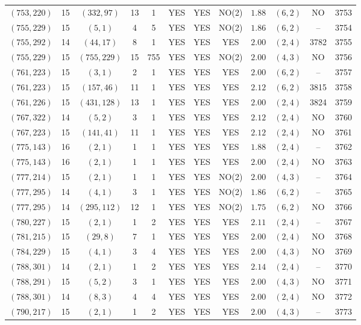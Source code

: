 \begin{longtable}{|c|c|c|c|c|c|c|c|c|c|c|c|}
$(753,220)$ & 15 & $(332,97)$ & 13 & 1 & YES & YES & NO(2) & $1.88$ & $(6,2)$ & NO & 3753\\
$(755,229)$ & 15 & $(5,1)$ & 4 & 5 & YES & YES & NO(2) & $1.86$ & $(6,2)$ & -- & 3754\\
$(755,292)$ & 14 & $(44,17)$ & 8 & 1 & YES & YES & YES & $2.00$ & $(2,4)$ & 3782 & 3755\\
$(755,229)$ & 15 & $(755,229)$ & 15 & 755 & YES & YES & NO(2) & $2.00$ & $(4,3)$ & NO & 3756\\
$(761,223)$ & 15 & $(3,1)$ & 2 & 1 & YES & YES & YES & $2.00$ & $(6,2)$ & -- & 3757\\
$(761,223)$ & 15 & $(157,46)$ & 11 & 1 & YES & YES & YES & $2.12$ & $(6,2)$ & 3815 & 3758\\
$(761,226)$ & 15 & $(431,128)$ & 13 & 1 & YES & YES & YES & $2.00$ & $(2,4)$ & 3824 & 3759\\
$(767,322)$ & 14 & $(5,2)$ & 3 & 1 & YES & YES & YES & $2.12$ & $(2,4)$ & NO & 3760\\
$(767,223)$ & 15 & $(141,41)$ & 11 & 1 & YES & YES & YES & $2.12$ & $(2,4)$ & NO & 3761\\
$(775,143)$ & 16 & $(2,1)$ & 1 & 1 & YES & YES & YES & $1.88$ & $(2,4)$ & -- & 3762\\
$(775,143)$ & 16 & $(2,1)$ & 1 & 1 & YES & YES & YES & $2.00$ & $(2,4)$ & NO & 3763\\
$(777,214)$ & 15 & $(2,1)$ & 1 & 1 & YES & YES & NO(2) & $2.00$ & $(4,3)$ & -- & 3764\\
$(777,295)$ & 14 & $(4,1)$ & 3 & 1 & YES & YES & NO(2) & $1.86$ & $(6,2)$ & -- & 3765\\
$(777,295)$ & 14 & $(295,112)$ & 12 & 1 & YES & YES & NO(2) & $1.75$ & $(6,2)$ & NO & 3766\\
$(780,227)$ & 15 & $(2,1)$ & 1 & 2 & YES & YES & YES & $2.11$ & $(2,4)$ & -- & 3767\\
$(781,215)$ & 15 & $(29,8)$ & 7 & 1 & YES & YES & YES & $2.00$ & $(2,4)$ & NO & 3768\\
$(784,229)$ & 15 & $(4,1)$ & 3 & 4 & YES & YES & YES & $2.00$ & $(4,3)$ & NO & 3769\\
$(788,301)$ & 14 & $(2,1)$ & 1 & 2 & YES & YES & YES & $2.14$ & $(2,4)$ & -- & 3770\\
$(788,291)$ & 15 & $(5,2)$ & 3 & 1 & YES & YES & YES & $2.00$ & $(4,3)$ & NO & 3771\\
$(788,301)$ & 14 & $(8,3)$ & 4 & 4 & YES & YES & YES & $2.00$ & $(2,4)$ & NO & 3772\\
$(790,217)$ & 15 & $(2,1)$ & 1 & 2 & YES & YES & YES & $2.00$ & $(4,3)$ & -- & 3773\\

\end{longtable}
